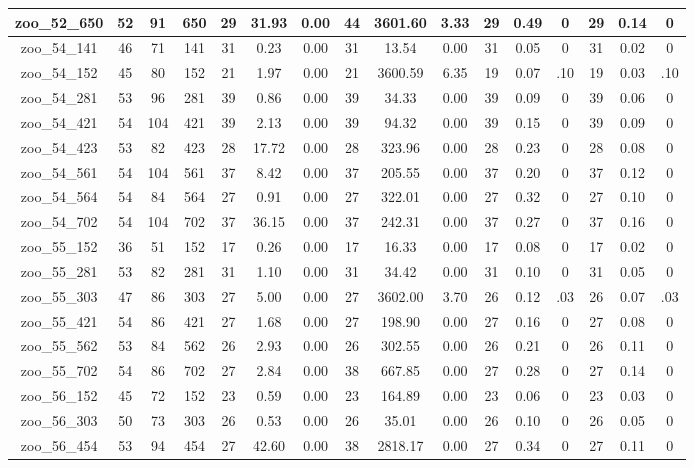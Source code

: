 \begin{landscape}
\begin{longtable}{|c|c|c|c|c|c|c|c|c|c|c|c|c|c|c|c|}
zoo\_52\_650 & 52 & 91 & 650 & 29 & 31.93 & 0.00 & 44 & 3601.60 & 3.33 & 29 & 0.49 & 0 & 29 & 0.14 & 0 \\ \hline 
zoo\_54\_141 & 46 & 71 & 141 & 31 & 0.23 & 0.00 & 31 & 13.54 & 0.00 & 31 & 0.05 & 0 & 31 & 0.02 & 0 \\ \hline 
zoo\_54\_152 & 45 & 80 & 152 & 21 & 1.97 & 0.00 & 21 & 3600.59 & 6.35 & 19 & 0.07 & .10 & 19 & 0.03 & .10 \\ \hline 
zoo\_54\_281 & 53 & 96 & 281 & 39 & 0.86 & 0.00 & 39 & 34.33 & 0.00 & 39 & 0.09 & 0 & 39 & 0.06 & 0 \\ \hline 
zoo\_54\_421 & 54 & 104 & 421 & 39 & 2.13 & 0.00 & 39 & 94.32 & 0.00 & 39 & 0.15 & 0 & 39 & 0.09 & 0 \\ \hline 
zoo\_54\_423 & 53 & 82 & 423 & 28 & 17.72 & 0.00 & 28 & 323.96 & 0.00 & 28 & 0.23 & 0 & 28 & 0.08 & 0 \\ \hline 
zoo\_54\_561 & 54 & 104 & 561 & 37 & 8.42 & 0.00 & 37 & 205.55 & 0.00 & 37 & 0.20 & 0 & 37 & 0.12 & 0 \\ \hline 
zoo\_54\_564 & 54 & 84 & 564 & 27 & 0.91 & 0.00 & 27 & 322.01 & 0.00 & 27 & 0.32 & 0 & 27 & 0.10 & 0 \\ \hline 
zoo\_54\_702 & 54 & 104 & 702 & 37 & 36.15 & 0.00 & 37 & 242.31 & 0.00 & 37 & 0.27 & 0 & 37 & 0.16 & 0 \\ \hline 
zoo\_55\_152 & 36 & 51 & 152 & 17 & 0.26 & 0.00 & 17 & 16.33 & 0.00 & 17 & 0.08 & 0 & 17 & 0.02 & 0 \\ \hline 
zoo\_55\_281 & 53 & 82 & 281 & 31 & 1.10 & 0.00 & 31 & 34.42 & 0.00 & 31 & 0.10 & 0 & 31 & 0.05 & 0 \\ \hline 
zoo\_55\_303 & 47 & 86 & 303 & 27 & 5.00 & 0.00 & 27 & 3602.00 & 3.70 & 26 & 0.12 & .03 & 26 & 0.07 & .03 \\ \hline 
zoo\_55\_421 & 54 & 86 & 421 & 27 & 1.68 & 0.00 & 27 & 198.90 & 0.00 & 27 & 0.16 & 0 & 27 & 0.08 & 0 \\ \hline 
zoo\_55\_562 & 53 & 84 & 562 & 26 & 2.93 & 0.00 & 26 & 302.55 & 0.00 & 26 & 0.21 & 0 & 26 & 0.11 & 0 \\ \hline 
zoo\_55\_702 & 54 & 86 & 702 & 27 & 2.84 & 0.00 & 38 & 667.85 & 0.00 & 27 & 0.28 & 0 & 27 & 0.14 & 0 \\ \hline 
zoo\_56\_152 & 45 & 72 & 152 & 23 & 0.59 & 0.00 & 23 & 164.89 & 0.00 & 23 & 0.06 & 0 & 23 & 0.03 & 0 \\ \hline 
zoo\_56\_303 & 50 & 73 & 303 & 26 & 0.53 & 0.00 & 26 & 35.01 & 0.00 & 26 & 0.10 & 0 & 26 & 0.05 & 0 \\ \hline 
zoo\_56\_454 & 53 & 94 & 454 & 27 & 42.60 & 0.00 & 38 & 2818.17 & 0.00 & 27 & 0.34 & 0 & 27 & 0.11 & 0 \\ \hline 

\end{longtable}
\end{landscape}
